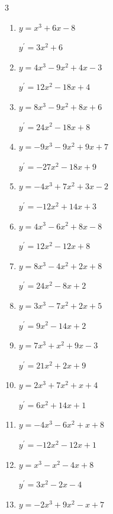 \begin{multicols}{3}
\begin{enumerate}
        $\displaystyle y^{\prime}=15x^{2}+14x-9$

  \item $y=x^{3}+6x-8$

        $\displaystyle y^{\prime}=3x^{2}+6$

  \item $y=4x^{3}-9x^{2}+4x-3$

        $\displaystyle y^{\prime}=12x^{2}-18x+4$

  \item $y=8x^{3}-9x^{2}+8x+6$

        $\displaystyle y^{\prime}=24x^{2}-18x+8$

  \item $y=-9x^{3}-9x^{2}+9x+7$

        $\displaystyle y^{\prime}=-27x^{2}-18x+9$

  \item $y=-4x^{3}+7x^{2}+3x-2$

        $\displaystyle y^{\prime}=-12x^{2}+14x+3$

  \item $y=4x^{3}-6x^{2}+8x-8$

        $\displaystyle y^{\prime}=12x^{2}-12x+8$

  \item $y=8x^{3}-4x^{2}+2x+8$

        $\displaystyle y^{\prime}=24x^{2}-8x+2$

  \item $y=3x^{3}-7x^{2}+2x+5$

        $\displaystyle y^{\prime}=9x^{2}-14x+2$

  \item $y=7x^{3}+x^{2}+9x-3$

        $\displaystyle y^{\prime}=21x^{2}+2x+9$

  \item $y=2x^{3}+7x^{2}+x+4$

        $\displaystyle y^{\prime}=6x^{2}+14x+1$

  \item $y=-4x^{3}-6x^{2}+x+8$

        $\displaystyle y^{\prime}=-12x^{2}-12x+1$

  \item $y=x^{3}-x^{2}-4x+8$

        $\displaystyle y^{\prime}=3x^{2}-2x-4$

  \item $y=-2x^{3}+9x^{2}-x+7$


\end{enumerate}
\end{multicols}
